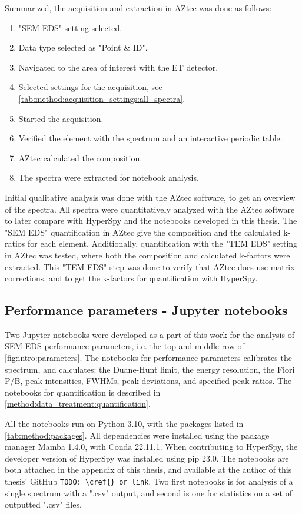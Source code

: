 Summarized, the acquisition and extraction in AZtec was done as follows:
\begin{enumerate}
    \item "SEM EDS" setting selected.
    \item Data type selected as "Point \& ID".
    \item Navigated to the area of interest with the ET detector.
    \item Selected settings for the acquisition, see \cref{tab:method:acquisition_settings:all_spectra}.
    \item Started the acquisition.
    \item Verified the element with the spectrum and an interactive periodic table.
    \item AZtec calculated the composition.
    \item The spectra were extracted for notebook analysis.
\end{enumerate}


Initial qualitative analysis was done with the AZtec software, to get an overview of the spectra.
All spectra were quantitatively analyzed with the AZtec software to later compare with HyperSpy and the notebooks developed in this thesis.
The "SEM EDS" quantification in AZtec give the composition and the calculated k-ratios for each element.
Additionally, quantification with the "TEM EDS" setting in AZtec was tested, where both the composition and calculated k-factors were extracted.
This "TEM EDS" step was done to verify that AZtec does use matrix corrections, and to get the k-factors for quantification with HyperSpy.



\subsection{Performance parameters - Jupyter notebooks}
\label{method:data_treatment:notebook}

Two Jupyter notebooks were developed as a part of this work for the analysis of SEM EDS performance parameters, i.e. the top and middle row of \cref{fig:intro:parameters}.
The notebooks for performance parameters calibrates the spectrum, and calculates: the Duane-Hunt limit, the energy resolution, the Fiori P/B, peak intensities, FWHMs, peak deviations, and specified peak ratios.
The notebooks for quantification is described in \cref{method:data_treatment:quantification}.


All the notebooks run on Python 3.10, with the packages listed in \cref{tab:method:packages}.
All dependencies were installed using the package manager Mamba 1.4.0, with Conda 22.11.1.
When contributing to HyperSpy, the developer version of HyperSpy was installed using pip 23.0.
The notebooks are both attached in the appendix of this thesis, and available at the author of this thesis' GitHub \verb|TODO: \cref{} or link|.
Two first notebooks is for analysis of a single spectrum with a ".csv" output, and second is one for statistics on a set of outputted ".csv" files.

